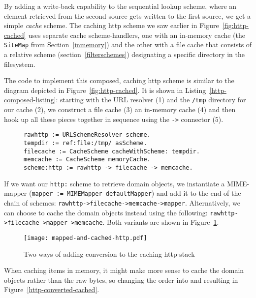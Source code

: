 \documentclass[preprint,authoryear]{llncs}
\begin{document}
By adding a write-back capability to the sequential lookup scheme, where an element
retrieved from the second source gets written to the first source, we get a simple \emph{cache} scheme.  
The caching http scheme we saw earlier in Figure~\ref{fig:http-cached} uses
separate cache scheme-handlers, one with an in-memory cache (the {\tt SiteMap} from Section~\ref{inmemory})
and the other with a file cache that consists of a relative scheme (section~\ref{filterschemes}) 
designating a specific directory in the filesystem.

The code to implement this composed, caching http scheme is similar 
to the diagram depicted in Figure~\ref{fig:http-cached}.  It is shown in Listing~\ref{http-composed-listing}:  
starting with the URL resolver (1) and the {\tt /tmp} directory for our cache (2), we construct
a file cache (3) an in-memory cache (4) and then hook up all these pieces together
in sequence using the {\tt ->} connector (5).

\begin{figure}[htbp]
\begin{lstlisting}[style=numbers,label=http-composed-listing,caption=Code for caching http stack.]
rawhttp := URLSchemeResolver scheme.
tempdir := ref:file:/tmp/ asScheme.
filecache := CacheScheme cacheWithScheme: tempdir.
memcache := CacheScheme memoryCache.
scheme:http := rawhttp -> filecache -> memcache.
\end{lstlisting}
\end{figure}

If we want our {\tt http:} scheme to retrieve domain objects, we instantiate a MIME-mapper
({\tt mapper := MIMEMapper defaultMapper}) and add it to the end of the chain of schemes: 
{\tt rawhttp->filecache->memcache->mapper}.  Alternatively, we can choose to cache the
domain objects instead using the following: {\tt rawhttp->filecache->mapper->memcache}.
Both variants are shown in Figure~\ref{http-cached-converted}.


\begin{figure}[htbp]
\centering
\texttt{[image: mapped-and-cached-http.pdf]}
\caption{Two ways of adding conversion to the caching http-stack}
\label{http-cached-converted}
\end{figure}

When caching items in memory, it might make more sense to cache the domain objects
rather than the raw bytes, so changing the order into 
and resulting in Figure~\ref{http-converted-cached}.
\end{document}
